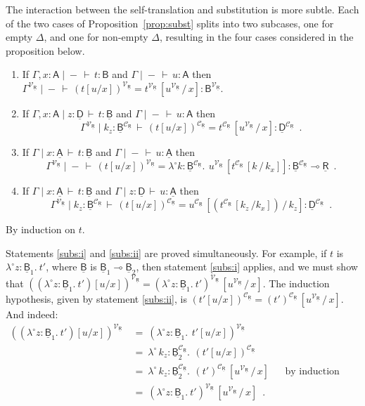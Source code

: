 \documentclass{LMCS}
\newcommand{\comptype}[1]{\underline{#1}}
\newcommand{\VA}{\mathsf{A}}
\newcommand{\VB}{\mathsf{B}}
\newcommand{\CA}{\comptype{\mathsf{A}}}
\newcommand{\CB}{\comptype{\mathsf{B}}}
\newcommand{\CD}{\comptype{\mathsf{D}}}
\newcommand{\CR}{\comptype{\mathsf{R}}}
\newcommand{\lpop}{\multimap}
\newcommand{\In}[2]{#1 \colon  \! #2}
\newcommand{\rIn}[2]{#1 \colon  #2}
\newcommand{\Cj}[4]{#1 \mid  \! #2 \, \vdash \, \rIn{#3}{#4}}
\newcommand{\Vj}[3]{\Cj{#1}{{-}}{#2}{#3}}
\newcommand{\Ceq}[5]{#1 \mid  \! #2 \, \vdash \, #3 = #4 \colon #5}
\newcommand{\Veq}[4]{\Ceq{#1}{-}{#2}{#3}{#4}}
\newcommand{\llambda}{\lambda^{\!\circ\!}}
\newcommand{\llam}[3]{\llambda \In{#1}{#2}.\: #3}
\newcommand{\lappl}[2]{#1[#2]}
\newcommand{\CpsVT}[1]{#1^{\mathcal{V}_{\CR}}}
\newcommand{\CpsCT}[1]{#1^{\mathcal{C}_{\CR}}}
\begin{document}
The interaction between the self-translation and substitution is more subtle.
Each of the two cases of Proposition~\ref{prop:subst} splits into
two subcases, one for empty $\Delta$, and one for non-empty $\Delta$,
resulting in the four cases considered in the proposition below. 
\begin{prop}[Substitution]
\leavevmode
\label{prop:trans:subs}
\begin{enumerate}[\em(1)]
\item \label{subs:i}
If $\Vj{\Gamma, \In{x}{\VA}}{t}{\VB}$ and $\Vj{\Gamma}{u}{\VA}$ then
$\Veq{\CpsVT{\Gamma}}{\CpsVT{(t[u/x])}}{\CpsVT{t}\, [\CpsVT{u}\, / \, x]}{\CpsVT{\VB}}$.
\item \label{subs:ii}
If $\Cj{\Gamma, \In{x}{\VA}}{\In{z}{\CD}}{t}{\CB}$ and $\Vj{\Gamma}{u}{\VA}$ then
\[\Ceq{\CpsVT{\Gamma}}{\In{k_z}{\CpsCT{\CB}}}
   {\CpsCT{(t[u/x])}}{\CpsCT{t}\, [\CpsVT{u}\, / \, x]}{\CpsCT{\CD}} \enspace .\]
\item \label{subs:iii}
If $\Cj{\Gamma}{\In{x}{\CA}}{t}{\CB}$ and $\Vj{\Gamma}{u}{\CA}$
then \[\Veq{\CpsVT{\Gamma}}{\CpsVT{(t[u/x])}}
    {\llam{k}{\CpsCT{\CB}}{\,\lappl{\CpsVT{u}\,}{\CpsCT{t}\,[k\,/\,k_x]}}}{\CpsCT{\CB} \lpop \CR} \enspace .\]
\item \label{subs:iv}
If $\Cj{\Gamma}{\In{x}{\CA}}{t}{\CB}$ and $\Cj{\Gamma}{\In{z}{\CD}}{u}{\CA}$ 
then \[\Ceq{\CpsVT{\Gamma}}{\In{k_z}{\CpsCT{\CB}}}{\CpsCT{(t[u/x])}}
    {\CpsCT{u}\, [(\CpsCT{t}\,[k_z\, / k_x])\, / \, k_z]}{\CpsCT{\CD}} \enspace .\]
\end{enumerate}
\end{prop}
\proof
By induction on $t$.

Statements \ref{subs:i} and \ref{subs:ii} are proved simultaneously. For example,
if $t$ is $\llam{z}{\CB_1}{t'}$, where $\CB$ is $\CB_1 \lpop \CB_2$, then
statement \ref{subs:i} applies, and we must show that 
$\CpsVT{((\llam{z}{\CB_1}{t'})[u/x])} = \CpsVT{(\llam{z}{\CB_1}{t'})}\, [\CpsVT{u}\, / \, x]$.
The induction hypothesis, given by statement \ref{subs:ii}, is
$\CpsCT{(t'[u/x])} = \CpsCT{(t')}\, [\CpsVT{u}\, / \, x]$. And indeed:
\begin{align*}
\CpsVT{((\llam{z}{\CB_1}{t'})[u/x])} \: 
&  = \: \CpsVT{(\llam{z}{\CB_1}{\, t'[u/x]})}
\\
& = \: \llam{\,k_z}{\CpsCT{\CB_2}}{\, \CpsCT{(t'[u/x])}}
\\
& = \: \llam{\,k_z}{\CpsCT{\CB_2}}{\, \CpsCT{(t')}\, [\CpsVT{u}\, / \, x]}
  && \text{by induction hypothesis}
\\
& = \: \CpsVT{(\llam{z}{\CB_1}{t'})}\, [\CpsVT{u}\, / \, x] \enspace .
\end{align*}
\end{document}
